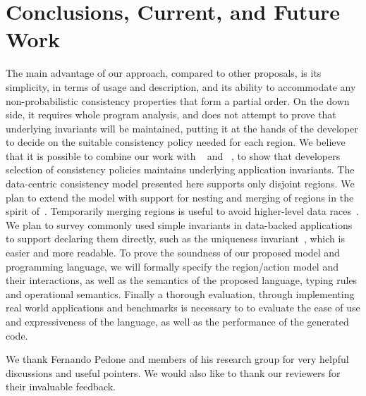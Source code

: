 \documentclass[numbers]{sigplanconf}
\begin{document}
\section{Conclusions, Current, and Future Work}
\label{sec:conclusion}
The main advantage of our approach, compared to other proposals, is its simplicity,
in terms of usage and description, and its ability to accommodate any
non-probabilistic consistency properties that form a partial order. On the down side, 
it requires whole program analysis, and does not attempt to prove that underlying 
invariants will be maintained, putting it at the hands of the developer to decide 
on the suitable consistency policy needed for each region. We believe that it is 
possible to combine our work with ~\cite{gotsman2016cause}
and ~\cite{balegas2015putting}, to show that developers selection of consistency
policies maintains underlying application invariants.
The data-centric consistency model presented here supports only 
disjoint regions. We plan to extend the model with support for nesting and merging 
of regions in the spirit of~\cite{dolby2012data}.
Temporarily merging regions is useful to avoid higher-level data races~\cite{artho2003high}.
We plan to survey commonly used simple invariants in data-backed applications to support
declaring them directly, such as the uniqueness invariant~\cite{bailis2015feral},
which is easier  and more readable. To prove the soundness of our proposed model and 
programming language, we will formally specify the region/action model and their
interactions, as well as the semantics of the proposed language, typing rules
and operational semantics. Finally a thorough evaluation, through implementing
real world applications and benchmarks is necessary to to evaluate the ease of use
and expressiveness of the language, as well as the performance of the generated
code.


\acks We thank Fernando Pedone and members of his research group
for very helpful discussions and useful pointers. We would also like to
thank our reviewers for their invaluable feedback.







\end{document}
